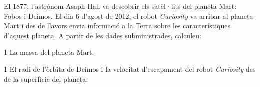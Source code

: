 El 1877, l'astrònom Asaph Hall va descobrir els satèl·lits del planeta Mart: Fobos i Deimos. El dia 6 d'agost de 2012, el robot \textit{Curiosity} va arribar al planeta Mart i des de llavors envia informació a la Terra sobre les característiques d'aquest planeta. A partir de les dades subministrades, calculeu:


\begin{apartat}{1}
La massa del planeta Mart.
\end{apartat}

\begin{apartat}{1}
El radi de l'òrbita de Deimos i la velocitat d'escapament del robot \textit{Curiosity} des de la superfície del planeta.
\end{apartat}

